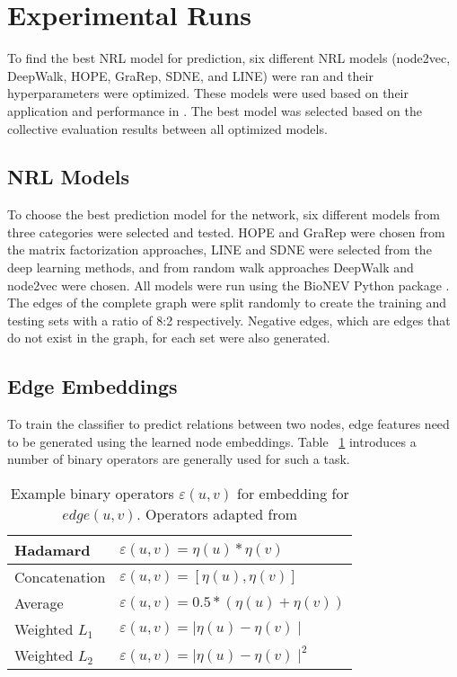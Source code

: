 \section{Experimental Runs}
To find the best \ac{NRL} model for prediction, six different \ac{NRL} models (node2vec, DeepWalk, \ac{HOPE}, \ac{GraRep}, \ac{SDNE}, and \ac{LINE}) were ran and their hyperparameters were optimized. These models were used based on their application and performance in \cite{yue_graph_2019}. The best model was selected based on the collective evaluation results between all optimized models. 

\subsection{\ac{NRL} Models}
To choose the best prediction model for the network, six different models from three categories were selected and tested. \ac{HOPE} and \ac{GraRep} were chosen from the matrix factorization approaches, \ac{LINE} and \ac{SDNE} were selected from the deep learning methods, and from random walk approaches DeepWalk and node2vec were chosen. All models were run using the BioNEV Python package \cite{yue_graph_2019}. The edges of the complete graph were split randomly to create the training and testing sets with a ratio of 8:2 respectively. Negative edges, which are edges that do not exist in the graph, for each set were also generated.

\subsection{Edge Embeddings}
To train the classifier to predict relations between two nodes, edge features need to be generated using the learned node embeddings. Table ~\ref{tab:operators} introduces a number of binary operators are generally used for such a task. 

\begin{table}[h!]
    \centering
    \begin{tabular}{ |l|l| } 
        \hline
        Hadamard & $\varepsilon(u,v)= \eta(u)*\eta(v)$ \\ 
        \hline
        Concatenation & $\varepsilon(u,v)=[\eta(u), \eta(v)]$ \\ 
        \hline
        Average & $\varepsilon(u,v)=0.5*(\eta(u)+\eta(v))$ \\ 
        \hline
        Weighted $L_{1}$ & $\varepsilon(u,v)=\mid\eta(u)-\eta(v)\mid$ \\
        \hline
        Weighted $L_{2}$ & $\varepsilon(u,v)=\mid\eta(u)-\eta(v)\mid^2$ \\
        \hline
    \end{tabular}
    \caption[Example binary operators $\varepsilon(u,v)$ for embedding for $edge(u,v)$]{Example binary operators $\varepsilon(u,v)$ for embedding for $edge(u,v)$. Operators adapted from \cite{grover_node2vec:_2016}}
    \label{tab:operators}
\end{table}


